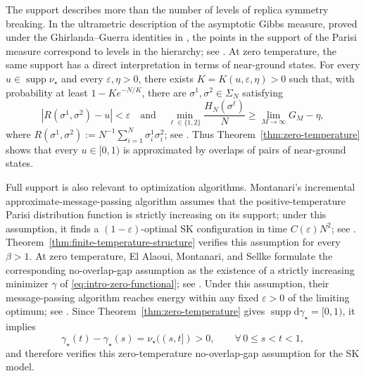 \documentclass[10pt]{amsart}
\theoremstyle{definition}
\theoremstyle{remark}
\numberwithin{equation}{section}
\newcommand{\1}{\mathbf 1}
\newcommand{\supp}{\operatorname{supp}}
\begin{document}
The support describes more than the number of levels of replica symmetry breaking. In the ultrametric description of the asymptotic Gibbs measure, proved under the Ghirlanda--Guerra identities in \cite[Theorem 1]{PanchenkoUltrametricity}, the points in the support of the Parisi measure correspond to levels in the hierarchy; see \cite[Section~1]{AuffingerChenZeng}. At zero temperature, the same support has a direct interpretation in terms of near-ground states. For every $u\in\supp\nu_\star$ and every $\varepsilon,\eta>0$, there exists $K=K(u,\varepsilon,\eta)>0$ such that, with probability at least $1-Ke^{-N/K}$, there are $\sigma^1,\sigma^2\in\Sigma_N$ satisfying
\begin{equation*}
 |R(\sigma^1,\sigma^2)-u|<\varepsilon
 \quad\text{and}\quad
 \min_{\ell\in\{1,2\}}\frac{H_N(\sigma^\ell)}N\geq\lim_{M\to\infty}G_M-\eta,
\end{equation*}
where $R(\sigma^1,\sigma^2):=N^{-1}\sum_{i=1}^N\sigma_i^1\sigma_i^2$; see \cite[Equation~(6)]{AuffingerChenZeng}. Thus Theorem~\ref{thm:zero-temperature} shows that every $u\in[0,1)$ is approximated by overlaps of pairs of near-ground states.

Full support is also relevant to optimization algorithms. Montanari's incremental approximate-message-passing algorithm assumes that the positive-temperature Parisi distribution function is strictly increasing on its support; under this assumption, it finds a $(1-\varepsilon)$-optimal SK configuration in time $C(\varepsilon)N^2$; see \cite[Assumption~1 and Theorem~2]{MontanariSKOptimization}. Theorem~\ref{thm:finite-temperature-structure} verifies this assumption for every $\beta>1$. At zero temperature, El Alaoui, Montanari, and Sellke formulate the corresponding no-overlap-gap assumption as the existence of a strictly increasing minimizer $\gamma$ of \eqref{eq:intro-zero-functional}; see \cite[Assumption~2]{ElAlaouiMontanariSellke}. Under this assumption, their message-passing algorithm reaches energy within any fixed $\varepsilon>0$ of the limiting optimum; see \cite[Corollary~2.2]{ElAlaouiMontanariSellke}. Since Theorem~\ref{thm:zero-temperature} gives $\supp\mathrm d\gamma_\star=[0,1)$, it implies
\begin{equation*}
 \gamma_\star(t)-\gamma_\star(s)
 =\nu_\star((s,t])>0,
 \qquad \forall\,0\leq s<t<1,
\end{equation*}
and therefore verifies this zero-temperature no-overlap-gap assumption for the SK model.

\medskip
\end{document}
